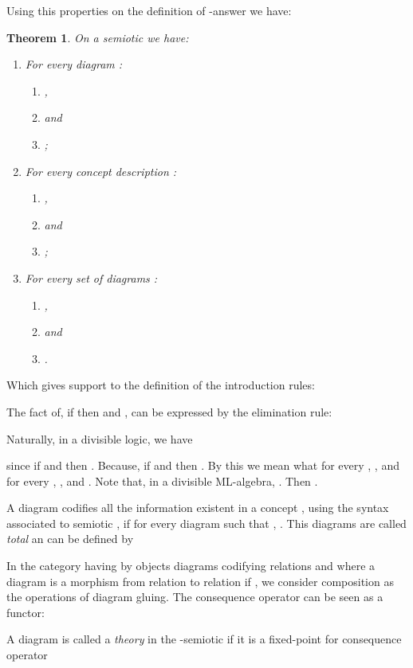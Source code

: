 \documentclass[oribibl]{llncs}
\newtheorem{thm}{Theorem}
\begin{document}
Using this properties on the definition of -answer we have:

\begin{thm} On a semiotic we have:
\begin{enumerate}
  \item For every diagram :
   \begin{enumerate}
     \item ,
     \item  and
     \item ;
   \end{enumerate}

  \item For every concept description :
  \begin{enumerate}
    \item ,
    \item  and
    \item ;
  \end{enumerate}

  \item For every set of diagrams :
  \begin{enumerate}
    \item ,
    \item  and
    \item .
  \end{enumerate}

\end{enumerate}
\end{thm}

Which gives support to the definition of the introduction rules:


The fact of, if  then  and , can be expressed by the elimination rule:


Naturally, in a divisible logic, we have

since if  and  then . Because, if  and  then
. By this we mean what for
every , , and
for every , , and . Note that, in a divisible ML-algebra, . Then .

A diagram  codifies all the information existent in a concept , using the syntax associated to semiotic , if for every diagram  such that , . This diagrams are called \emph{total} an can be defined by 

In the category  having by objects diagrams codifying relations and where a diagram  is a morphism from relation  to relation  if , we consider composition as the operations of diagram gluing. The consequence operator  can be seen as a functor:

A diagram  is called a \emph{theory} in the -semiotic  if it is a fixed-point for consequence operator 
\end{document}
